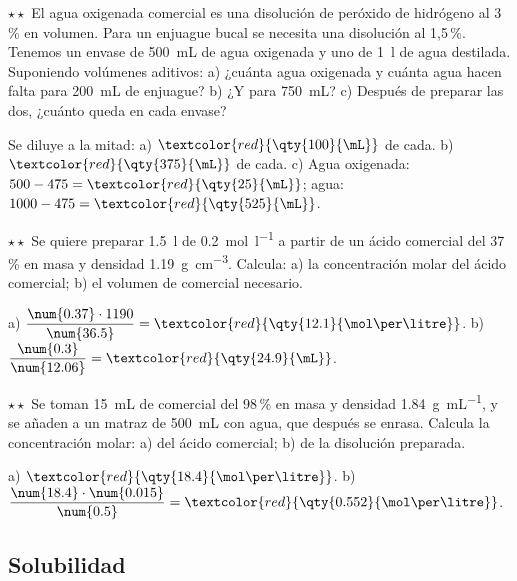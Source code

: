 \begin{exercise}
    \(\star\star\) El agua oxigenada comercial es una disolución de peróxido de hidrógeno al 3\,\% en volumen. Para un enjuague bucal
    se necesita una disolución al 1,5\,\%. Tenemos un envase de \qty{500}{\mL} de agua oxigenada y uno de \qty{1}{\litre} de agua
    destilada. Suponiendo volúmenes aditivos: a) ¿cuánta agua oxigenada y cuánta agua hacen falta para \qty{200}{\mL} de enjuague?
    b) ¿Y para \qty{750}{\mL}? c) Después de preparar las dos, ¿cuánto queda en cada envase?
    \begin{solu}
        Se diluye a la mitad: a) \(\textcolor{red}{\qty{100}{\mL}}\) de cada. b) \(\textcolor{red}{\qty{375}{\mL}}\) de cada.
        c) Agua oxigenada: \(500 - 475 = \textcolor{red}{\qty{25}{\mL}}\); agua: \(1000 - 475 = \textcolor{red}{\qty{525}{\mL}}\).
    \end{solu}
\end{exercise}

\begin{exercise}
    \(\star\star\) Se quiere preparar \qty{1.5}{\litre} de  \qty{0.2}{\mol\per\litre} a partir de un ácido comercial del
    37\,\% en masa y densidad \qty{1.19}{\gram\per\cubic\cm}. Calcula: a) la concentración molar del ácido comercial; b) el volumen
    de comercial necesario.
    \begin{solu}
        a) \(\dfrac{\num{0.37} \cdot 1190}{\num{36.5}} = \textcolor{red}{\qty{12.1}{\mol\per\litre}}\). b) \(\dfrac{\num{0.3}}{\num{12.06}} = \textcolor{red}{\qty{24.9}{\mL}}\).
    \end{solu}
\end{exercise}

\begin{exercise}
    \(\star\star\) Se toman \qty{15}{\mL} de  comercial del 98\,\% en masa y densidad \qty{1.84}{\gram\per\mL}, y se
    añaden a un matraz de \qty{500}{\mL} con agua, que después se enrasa. Calcula la concentración molar: a) del ácido comercial;
    b) de la disolución preparada.
    \begin{solu}
        a) \(\textcolor{red}{\qty{18.4}{\mol\per\litre}}\). b) \(\dfrac{\num{18.4} \cdot \num{0.015}}{\num{0.5}} = \textcolor{red}{\qty{0.552}{\mol\per\litre}}\).
    \end{solu}
\end{exercise}

\subsection{Solubilidad}

